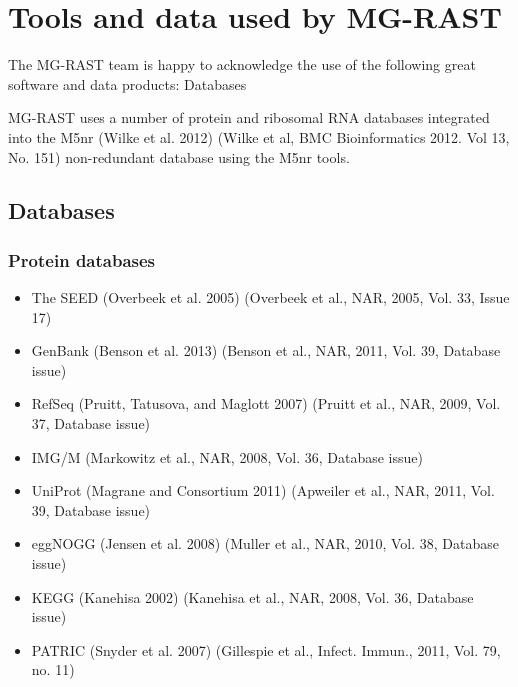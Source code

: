 \documentclass[letterpaper,10pt,english]{sphinxmanual}
\begin{document}
\chapter{Tools and data used by MG-RAST}
\label{\detokenize{user_manual:tools-and-data-used-by-mg-rast}}
The MG-RAST team is happy to acknowledge the use of the following great
software and data products: Databases

MG-RAST uses a number of protein and ribosomal RNA databases integrated
into the M5nr (Wilke et al. 2012) (Wilke et al, BMC Bioinformatics 2012.
Vol 13, No. 151) non-redundant database using the M5nr tools.


\section{Databases}
\label{\detokenize{user_manual:databases}}

\subsection{Protein databases}
\label{\detokenize{user_manual:protein-databases}}\begin{itemize}
\item {} 
The SEED (Overbeek et al. 2005) (Overbeek et al., NAR, 2005, Vol. 33,
Issue 17)

\item {} 
GenBank (Benson et al. 2013) (Benson et al., NAR, 2011, Vol. 39,
Database issue)

\item {} 
RefSeq (Pruitt, Tatusova, and Maglott 2007) (Pruitt et al., NAR,
2009, Vol. 37, Database issue)

\item {} 
IMG/M (Markowitz et al., NAR, 2008, Vol. 36, Database issue)

\item {} 
UniProt (Magrane and Consortium 2011) (Apweiler et al., NAR, 2011,
Vol. 39, Database issue)

\item {} 
eggNOGG (Jensen et al. 2008) (Muller et al., NAR, 2010, Vol. 38,
Database issue)

\item {} 
KEGG (Kanehisa 2002) (Kanehisa et al., NAR, 2008, Vol. 36, Database
issue)

\item {} 
PATRIC (Snyder et al. 2007) (Gillespie et al., Infect. Immun., 2011,
Vol. 79, no. 11)

\end{itemize}
\end{document}

